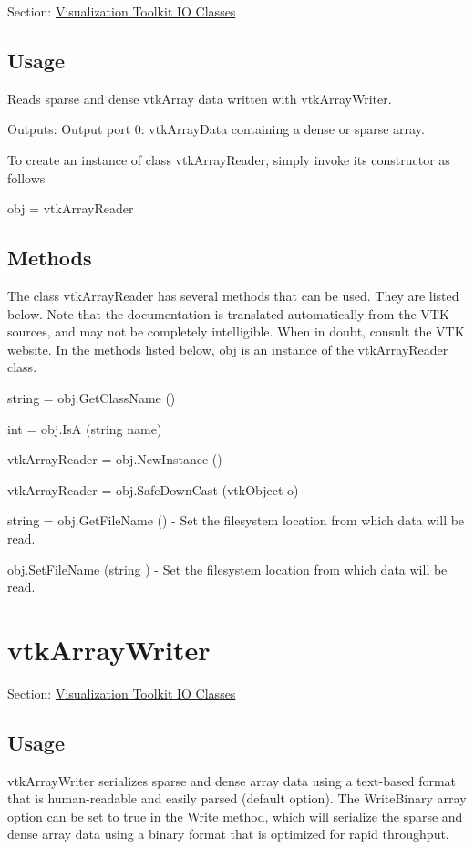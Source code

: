 Section\-: \hyperlink{sec_vtkio}{Visualization Toolkit I\-O Classes} \hypertarget{vtkwidgets_vtkxyplotwidget_Usage}{}\subsection{Usage}\label{vtkwidgets_vtkxyplotwidget_Usage}
Reads sparse and dense vtk\-Array data written with vtk\-Array\-Writer.

Outputs\-: Output port 0\-: vtk\-Array\-Data containing a dense or sparse array.

To create an instance of class vtk\-Array\-Reader, simply invoke its constructor as follows \begin{DoxyVerb}  obj = vtkArrayReader
\end{DoxyVerb}
 \hypertarget{vtkwidgets_vtkxyplotwidget_Methods}{}\subsection{Methods}\label{vtkwidgets_vtkxyplotwidget_Methods}
The class vtk\-Array\-Reader has several methods that can be used. They are listed below. Note that the documentation is translated automatically from the V\-T\-K sources, and may not be completely intelligible. When in doubt, consult the V\-T\-K website. In the methods listed below, {\ttfamily obj} is an instance of the vtk\-Array\-Reader class. 
\begin{DoxyItemize}
\item {\ttfamily string = obj.\-Get\-Class\-Name ()}  
\item {\ttfamily int = obj.\-Is\-A (string name)}  
\item {\ttfamily vtk\-Array\-Reader = obj.\-New\-Instance ()}  
\item {\ttfamily vtk\-Array\-Reader = obj.\-Safe\-Down\-Cast (vtk\-Object o)}  
\item {\ttfamily string = obj.\-Get\-File\-Name ()} -\/ Set the filesystem location from which data will be read.  
\item {\ttfamily obj.\-Set\-File\-Name (string )} -\/ Set the filesystem location from which data will be read.  
\end{DoxyItemize}\hypertarget{vtkio_vtkarraywriter}{}\section{vtk\-Array\-Writer}\label{vtkio_vtkarraywriter}
Section\-: \hyperlink{sec_vtkio}{Visualization Toolkit I\-O Classes} \hypertarget{vtkwidgets_vtkxyplotwidget_Usage}{}\subsection{Usage}\label{vtkwidgets_vtkxyplotwidget_Usage}
vtk\-Array\-Writer serializes sparse and dense array data using a text-\/based format that is human-\/readable and easily parsed (default option). The Write\-Binary array option can be set to true in the Write method, which will serialize the sparse and dense array data using a binary format that is optimized for rapid throughput.

